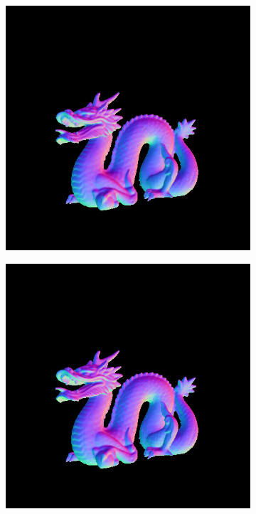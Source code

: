 \begin{figure}[th]
\begin{subfigure}[b]{0.24\linewidth}
	\end{subfigure}
	\begin{subfigure}[b]{0.24\linewidth}
		\includegraphics[width=\linewidth]{./Figures/comparison_512/fancy_eval_14_normal_NNNN-512.png}
	\end{subfigure}
	\begin{subfigure}[b]{0.24\linewidth}
		\includegraphics[width=\linewidth]{./Figures/comparison_512/fancy_eval_14_normal_Trip-Net-512.png}
	\end{subfigure}
	

\end{figure}
